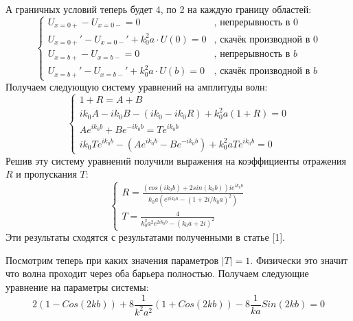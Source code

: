 \documentclass[11pt]{article}    %
\begin{document}
А граничных условий теперь будет 4, по 2 на каждую границу областей:
\begin{equation}
    \begin{cases}
        U_{x=0+} - U_{x=0-} = 0 & \text{, непрерывность в $0$}
        \\
        U_{x=0+}' - U_{x=0-}' + k_0^2 a \cdot U(0) = 0 & \text{, скачёк производной в $0$}
        \\
        U_{x=b+} - U_{x=b-} = 0 & \text{, непрерывность в $b$}
        \\
        U_{x=b+}' - U_{x=b-}' + k_0^2 a \cdot U(b) = 0 & \text{, скачёк производной в $b$}
    \end{cases}
\end{equation}
Получаем следующую систему уравнений на амплитуды волн:
\begin{equation}
    \begin{cases}
        1 + R = A + B %
        \\
        ik_{0}A - ik_{0}B - (ik_0 - ik_0R) + k_0^2 a (1 + R) = 0 %
        \\
        Ae^{ik_{0}b} + Be^{-ik_{0}b} = Te^{ik_{0}b} %
        \\
        ik_{0}Te^{ik_{0}b} - (Ae^{ik_{0}b} - Be^{-ik_{0}b}) + k_0^2 a Te^{ik_{0}b} = 0 %
    \end{cases}
\end{equation}
Решив эту систему уравнений получили выражения на коэффициенты отражения $R$ и пропускания $T$:
\begin{equation}
    \begin{cases}
        R = \frac{(cos(ik_{0}b) + 2sin(k_0b))ie^{ik_{0}b}}{k_0a(e^{2ik_{0}b}-(1 + 2i/k_0a)^2)}
        \\
        T = \frac{4}{k_0^2a^2e^{2ik_{0}b}-(k_0a + 2i)^2}
    \end{cases}
\end{equation}
Эти результаты сходятся с результатами полученными в статье [1].
\par %
Посмотрим теперь при каких значения параметров $|T| = 1$. Физически это значит что волна проходит через оба барьера полностью.
Получаем следующие уравнение на параметры системы:
\begin{equation}
    2(1-Cos(2kb)) + 8 \frac{1}{k^2 a^2} (1+Cos(2kb)) - 8\frac{1}{k a}Sin(2kb) = 0
\end{equation}
\end{document}
